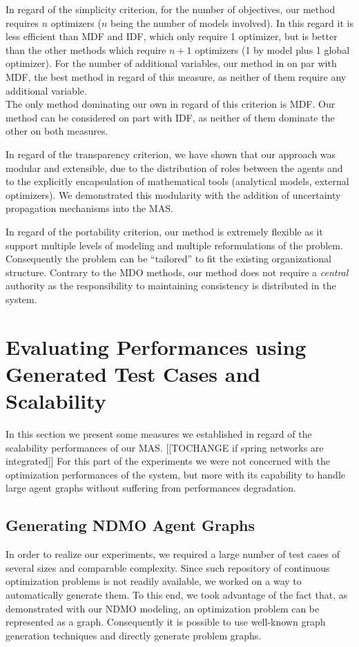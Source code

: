 In regard of the simplicity criterion, for the number of objectives, our method requires $n$ optimizers ($n$ being the number of models involved). In this regard it is less efficient than MDF and IDF, which only require 1 optimizer, but is better than the other methods which require $n+1$ optimizers (1 by model plus 1 global optimizer). For the number of additional variables, our method in on par with MDF, the best method in regard of this measure, as neither of them require any additional variable.\\
The only method dominating our own in regard of this criterion is MDF. Our method can be considered on part with IDF, as neither of them dominate the other on both measures.

In regard of the transparency criterion, we have shown that our approach was modular and extensible, due to the distribution of roles between the agents and to the explicitly encapsulation of mathematical tools (analytical models, external optimizers). We demonstrated this modularity with the addition of uncertainty propagation mechanisms into the MAS.

In regard of the portability criterion, our method is extremely flexible as it support multiple levels of modeling and multiple reformulations of the problem. Consequently the problem can be \enquote{tailored} to fit the existing organizational structure. Contrary to the MDO methods, our method does not require a \emph{central} authority as the responsibility to maintaining consistency is distributed in the system.

\chapter{Evaluating Performances using Generated Test Cases and Scalability}

In this section we present some measures we established in regard of the scalability performances of our MAS. [[TOCHANGE if spring networks are integrated]] For this part of the experiments we were not concerned with the optimization performances of the system, but more with its capability to handle large agent graphs without suffering from performances degradation.

\section{Generating NDMO Agent Graphs}

In order to realize our experiments, we required a large number of test cases of several sizes and comparable complexity. Since such repository of continuous optimization problems is not readily available, we worked on a way to automatically generate them. To this end, we took advantage of the fact that, as demonstrated with our NDMO modeling, an optimization problem can be represented as a graph. Consequently it is possible to use well-known graph generation techniques and directly generate problem graphs.

